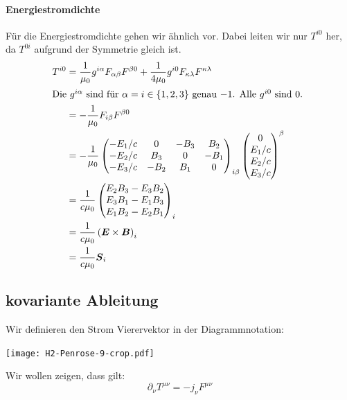 \paragraph{Energiestromdichte}

Für die Energiestromdichte gehen wir ähnlich vor. Dabei leiten wir nur $T^{i0}$
her, da $T^{0i}$ aufgrund der Symmetrie gleich ist.
\begin{align*}
	T^{i0}
	&= \frac1{\mu_0} g^{i\alpha} F_{\alpha\beta} F^{\beta0} + \frac1{4\mu_0} g^{i0} F_{\kappa\lambda} F^{\kappa\lambda} \\
	\intertext{%
		Die $g^{i\alpha}$ sind für $\alpha = i \in \set{1, 2, 3}$ genau $-1$. Alle
		$g^{i0}$ sind 0.
	}
	&= - \frac1{\mu_0} F_{i\beta} F^{\beta0} \\
	&= - \frac1{\mu_0}
	\begin{pmatrix}
		- E_1/c & 0 & -B_3 & B_2 \\
		- E_2/c & B_3 & 0 & -B_1 \\
		- E_3/c & -B_2 & B_1 & 0 \\
	\end{pmatrix}_{i\beta}
	\begin{pmatrix}
		0 \\ E_1/c \\ E_2/c \\ E_3/c
	\end{pmatrix}^{\beta}
	\\
	&= \frac1{c\mu_0}
	\begin{pmatrix}
		E_2B_3 - E_3B_2 \\
		E_3B_1 - E_1B_3 \\
		E_1B_2 - E_2B_1
	\end{pmatrix}_i \\
	&= \frac1{c\mu_0} \del{\vec E \times \vec B}_i \\
	&= \frac1{c\mu_0} \vec S_i \\
\end{align*}

\subsection{kovariante Ableitung}

Wir definieren den Strom Vierervektor in der Diagrammnotation:
\begin{center}
	\texttt{[image: H2-Penrose-9-crop.pdf]}
\end{center}

Wir wollen zeigen, dass gilt:
\[
	\partial_\nu T^{\mu\nu} = - j_\nu F^{\mu\nu}
\]

